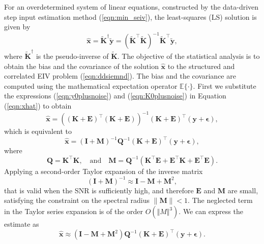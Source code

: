For an overdetermined system of linear equations, constructed by the data-driven step input estimation method (\ref{eqn:min_seiv}), the least-squares (LS) solution is given by
\begin{equation} \widehat{\mathbf{x}} = \widetilde{\mathbf{K}}^\dagger \widetilde{\mathbf{y}} = ( \widetilde{\mathbf{K}}^\top \widetilde{\mathbf{K}} )^{-1} \widetilde{\mathbf{K}}^\top \widetilde{\mathbf{y}} , \label{eqn:xhat} \end{equation}
where $\widetilde{\mathbf{K}}^\dagger$ is the pseudo-inverse of $\widetilde{\mathbf{K}}$.
The objective of the statistical analysis is to obtain the bias and the covariance of the solution $\widehat{\mathbf{x}}$ to the structured and correlated EIV problem (\ref{eqn:ddsiemnd}).
The bias and the covariance are computed using the mathematical expectation operator $\mathbb{E}\{\cdot\}$.
First we substitute the expressions (\ref{eqn:y0plusnoise}) and (\ref{eqn:K0plusnoise}) in Equation (\ref{eqn:xhat}) to obtain
\begin{equation*} \widehat{\mathbf{x}} = \left( (\mathbf{K}+\mathbf{E})^\top (\mathbf{K}+\mathbf{E})  \right)^{-1} (\mathbf{K}+\mathbf{E})^\top (\mathbf{y}+\bm{\epsilon}), \end{equation*} 
which is equivalent to
\begin{equation} \widehat{\mathbf{x}} = \left( \mathbf{I} + \mathbf{M} \right)^{-1} \mathbf{Q}^{-1} (\mathbf{K}+\mathbf{E})^\top (\mathbf{y}+\bm{\epsilon}), \label{eqn:1steq} \end{equation} 
where 
\begin{equation} \mathbf{Q} = \mathbf{K}^\top \mathbf{K}, \quad \text{and} \quad \mathbf{M} = \mathbf{Q}^{-1} ( \mathbf{K}^\top \mathbf{E} + \mathbf{E}^\top \mathbf{K} + \mathbf{E}^\top \mathbf{E} ). \end{equation} 
Applying a second-order Taylor expansion of the inverse matrix
\begin{equation} (\mathbf{I} + \mathbf{M})^{-1} \approx \mathbf{I} - \mathbf{M} + \mathbf{M}^2, \label{eqn:TseriesExp} \end{equation} 
that is valid when the SNR is sufficiently high, and therefore $\mathbf{E}$ and $\mathbf{M}$ are small, satisfying the constraint on the spectral radius $\| \mathbf{M} \| < 1$. 
The neglected term in the Taylor series expansion is of the order $O(\Vert M \Vert^3)$.
We can express the estimate as
\begin{equation} \widehat{\mathbf{x}} \approx \left( \mathbf{I} - \mathbf{M} + \mathbf{M}^2 \right) \mathbf{Q}^{-1} (\mathbf{K}+\mathbf{E})^\top (\mathbf{y}+\bm{\epsilon}). \label{eqn:xhatexp} \end{equation} 

